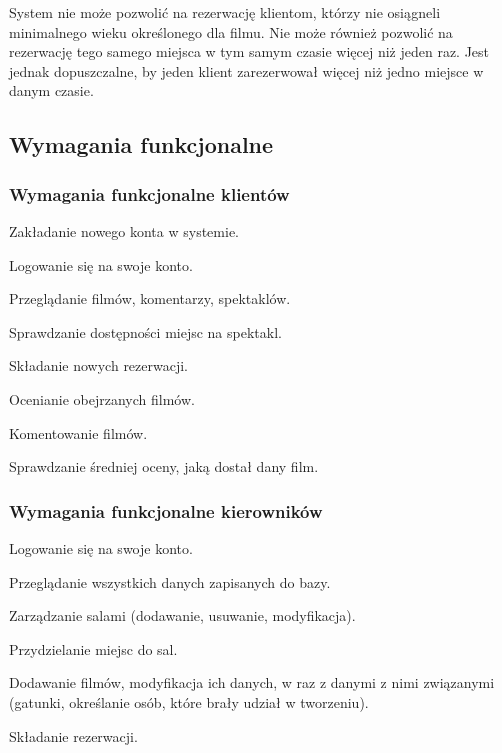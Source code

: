 System nie może pozwolić na rezerwację klientom, którzy nie osiągneli minimalnego wieku określonego dla filmu.
Nie może również pozwolić na rezerwację tego samego miejsca w tym samym czasie więcej niż jeden raz. Jest jednak dopuszczalne, by jeden klient zarezerwował więcej niż jedno miejsce w danym czasie.


\subsection*{Wymagania funkcjonalne}

\subsubsection*{Wymagania funkcjonalne klientów}
\begin{description}[style=nextline]
	\item[] Zakładanie nowego konta w systemie.
	\item[] Logowanie się na swoje konto.
	\item[] Przeglądanie filmów, komentarzy, spektaklów.
	\item[] Sprawdzanie dostępności miejsc na spektakl.
	\item[] Składanie nowych rezerwacji.
	\item[] Ocenianie obejrzanych filmów.
	\item[] Komentowanie filmów.
	\item[] Sprawdzanie średniej oceny, jaką dostał dany film. 
\end{description}

\subsubsection*{Wymagania funkcjonalne kierowników}
\begin{description}[style=nextline]
	\item[] Logowanie się na swoje konto.
	\item[] Przeglądanie wszystkich danych zapisanych do bazy.
	\item[] Zarządzanie salami (dodawanie, usuwanie, modyfikacja).
	\item[] Przydzielanie miejsc do sal.
	\item[] Dodawanie filmów, modyfikacja ich danych, w raz z danymi z nimi związanymi (gatunki, określanie osób, które brały udział w tworzeniu).
	\item[] Składanie rezerwacji.
\end{description}


